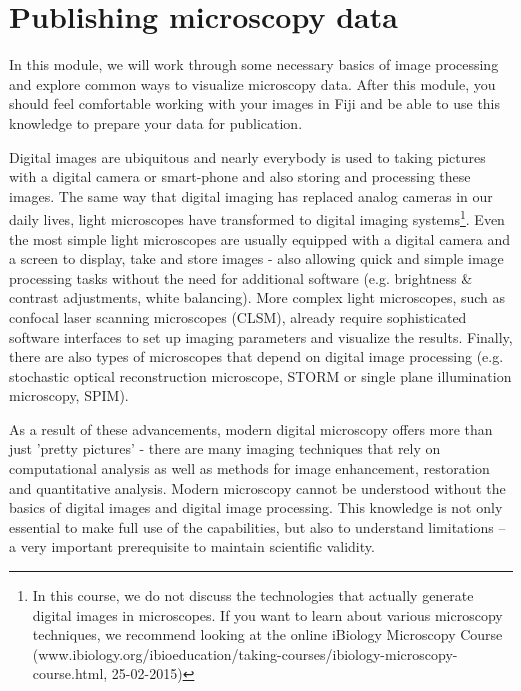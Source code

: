 \chapter{Publishing microscopy data}

In this module, we will work through some necessary basics of image processing and explore common ways to visualize microscopy data. After this module, you should feel comfortable working with your images in Fiji and be able to use this knowledge to prepare your data for publication.

Digital images are ubiquitous and nearly everybody is used to taking pictures with a digital camera or smart-phone and also storing and processing these images. The same way that digital imaging has replaced analog cameras in our daily lives, light microscopes have transformed to digital imaging systems\footnote{In this course, we do not discuss the technologies that actually generate digital images in microscopes. If you want to learn about various microscopy techniques, we recommend looking at the online iBiology Microscopy Course (www.ibiology.org/ibioeducation/taking-courses/ibiology-microscopy-course.html, 25-02-2015)}. Even the most simple light microscopes are usually equipped with a digital camera and a screen to display, take and store images - also allowing quick and simple image processing tasks without the need for additional software (e.g. brightness \& contrast adjustments, white balancing). More complex light microscopes, such as confocal laser scanning microscopes (CLSM), already require sophisticated software interfaces to set up imaging parameters and visualize the results. Finally, there are also types of microscopes that depend on digital image processing (e.g. stochastic optical reconstruction microscope, STORM or single plane illumination microscopy, SPIM).

As a result of these advancements, modern digital microscopy offers more than just 'pretty pictures' - there are many imaging techniques that rely on computational analysis as well as methods for image enhancement, restoration and quantitative analysis. Modern microscopy cannot be understood without the basics of digital images and digital image processing. This knowledge is not only essential to make full use of the capabilities, but also to understand limitations -- a very important prerequisite to maintain scientific validity.

